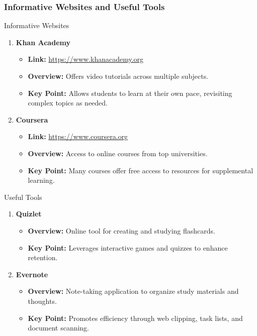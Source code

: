 \documentclass[aspectratio=169]{beamer}
\begin{document}
\begin{frame}[fragile]
    \frametitle{Informative Websites and Useful Tools}
    \begin{block}{Informative Websites}
        \begin{enumerate}
            \item \textbf{Khan Academy}
            \begin{itemize}
                \item \textbf{Link:} \url{https://www.khanacademy.org}
                \item \textbf{Overview:} Offers video tutorials across multiple subjects.
                \item \textbf{Key Point:} Allows students to learn at their own pace, revisiting complex topics as needed.
            \end{itemize}

            \item \textbf{Coursera}
            \begin{itemize}
                \item \textbf{Link:} \url{https://www.coursera.org}
                \item \textbf{Overview:} Access to online courses from top universities.
                \item \textbf{Key Point:} Many courses offer free access to resources for supplemental learning.
            \end{itemize}
        \end{enumerate}
    \end{block}

    \begin{block}{Useful Tools}
        \begin{enumerate}
            \item \textbf{Quizlet}
            \begin{itemize}
                \item \textbf{Overview:} Online tool for creating and studying flashcards.
                \item \textbf{Key Point:} Leverages interactive games and quizzes to enhance retention.
            \end{itemize}

            \item \textbf{Evernote}
            \begin{itemize}
                \item \textbf{Overview:} Note-taking application to organize study materials and thoughts.
                \item \textbf{Key Point:} Promotes efficiency through web clipping, task lists, and document scanning.
            \end{itemize}
        \end{enumerate}
    \end{block}
\end{frame}
\end{document}

